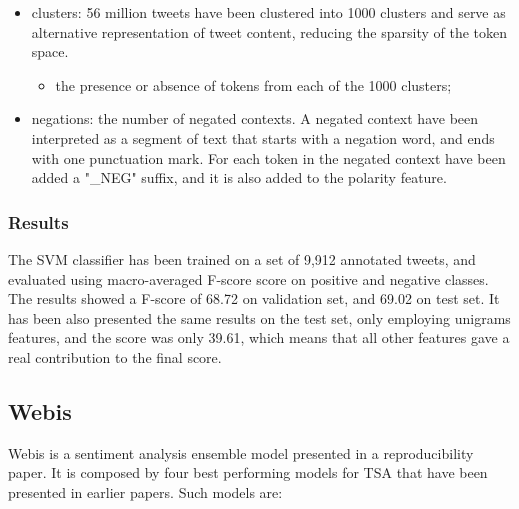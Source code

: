 \begin{itemize}
	\item clusters: 56 million tweets have been clustered into 1000 clusters and serve as alternative representation of tweet content, reducing the sparsity of the token space.
	\begin{itemize}
		\item the presence or absence of tokens from each of the 1000 clusters;
	\end{itemize}
	\item negations: the number of negated contexts. A negated context have been interpreted as a segment of text that starts with a negation word, and ends with one punctuation mark. For each token in the negated context have been added a "\_NEG" suffix, and it is also added to the polarity feature.
\end{itemize}

\subsubsection{Results}

The \ac{SVM} classifier has been trained on a set of 9,912 annotated tweets, and evaluated using macro-averaged F-score score on positive and negative classes. The results showed a F-score of 68.72 on validation set, and 69.02 on test set. It has been also presented the same results on the test set, only employing unigrams features, and the score was only 39.61, which means that all other features gave a real contribution to the final score. 


\subsection{Webis}

Webis \cite{hagen-etal-2015-webis} is a sentiment analysis ensemble model presented in a reproducibility paper. It is composed by four best performing models for \ac{TSA} that have been presented in earlier papers. Such models are:

